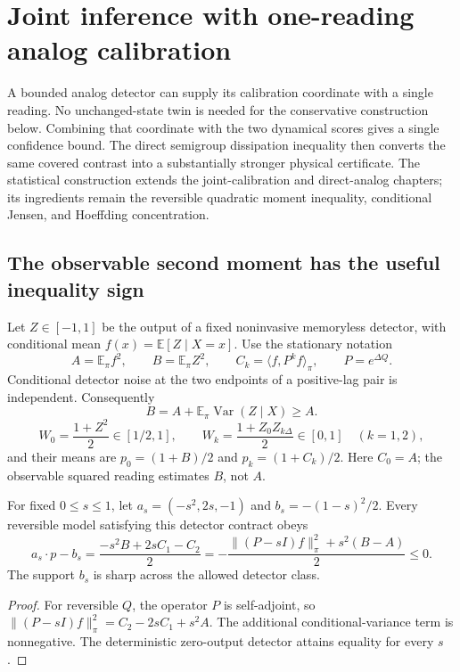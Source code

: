 \chapter{Joint inference with one-reading analog calibration}
\label{ch:pa-joint-analog}

A bounded analog detector can supply its calibration coordinate with a single
reading. No unchanged-state twin is needed for the conservative construction
below. Combining that coordinate with the two dynamical scores gives a single
confidence bound. The direct semigroup dissipation inequality then converts
the same covered contrast into a substantially stronger physical certificate.
The statistical construction extends the joint-calibration and direct-analog
chapters; its ingredients remain the reversible quadratic moment inequality,
conditional Jensen, and Hoeffding concentration.

\section{The observable second moment has the useful inequality sign}
Let $Z\in[-1,1]$ be the output of a fixed noninvasive memoryless detector, with
conditional mean $f(x)=\mathbb E[Z\mid X=x]$. Use the stationary notation
\[
 A=\mathbb E_\pi f^2,\qquad B=\mathbb E_\pi Z^2,
 \qquad C_k=\langle f,P^k f\rangle_\pi,
 \qquad P=e^{\Delta Q}.
\]
Conditional detector noise at the two endpoints of a positive-lag pair is
independent. Consequently
\[
 B=A+\mathbb E_\pi\operatorname{Var}(Z\mid X)\geq A.
\]
\[
 W_0=\frac{1+Z^2}{2}\in[1/2,1],\qquad
 W_k=\frac{1+Z_0Z_{k\Delta}}2\in[0,1]\quad(k=1,2),
\]
and their means are $p_0=(1+B)/2$ and $p_k=(1+C_k)/2$.
Here $C_0=A$; the observable squared reading estimates $B$, not $A$.

\begin{proposition}
For fixed $0\leq s\leq1$, let $a_s=(-s^2,2s,-1)$ and
$b_s=-(1-s)^2/2$. Every reversible model satisfying this detector contract obeys
\begin{equation}
 a_s\cdot p-b_s
 =\frac{-s^2B+2sC_1-C_2}{2}
 =-\frac{\|(P-sI)f\|_\pi^2+s^2(B-A)}2\leq0.
 \label{eq:pa-analog-support}
\end{equation}
The support $b_s$ is sharp across the allowed detector class.
\end{proposition}
\begin{proof}
For reversible $Q$, the operator $P$ is self-adjoint, so
$\|(P-sI)f\|_\pi^2=C_2-2sC_1+s^2A$.
The additional conditional-variance term is nonnegative. The deterministic
zero-output detector attains equality for every $s$.
\end{proof}

